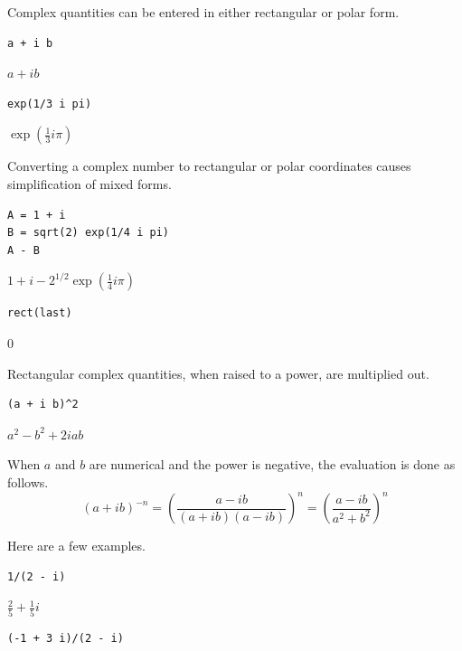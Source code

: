 \documentclass[12pt]{article}
\begin{document}
\bigskip

Complex quantities can be entered in either rectangular or polar form.

{\color{blue}
\begin{verbatim}
a + i b
\end{verbatim}
}

$\displaystyle a+ib$

{\color{blue}
\begin{verbatim}
exp(1/3 i pi)
\end{verbatim}
}

$\displaystyle \exp\left(\tfrac{1}{3}i\pi\right)$

\bigskip

Converting a complex number to rectangular or polar coordinates causes
simplification of mixed forms.

{\color{blue}
\begin{verbatim}
A = 1 + i
B = sqrt(2) exp(1/4 i pi)
A - B
\end{verbatim}
}

$\displaystyle 1+i-2^{1/2}\exp\left(\tfrac{1}{4}i\pi\right)$

{\color{blue}
\begin{verbatim}
rect(last)
\end{verbatim}
}

$\displaystyle 0$

\bigskip

Rectangular complex quantities, when raised to a power, are multiplied out.

{\color{blue}
\begin{verbatim}
(a + i b)^2
\end{verbatim}
}

$\displaystyle a^2-b^2+2iab$

\bigskip

When $a$ and $b$ are numerical and the power is negative, the evaluation is done as follows.
\begin{equation*}
(a+ib)^{-n}
=\left(\frac{a-ib}{(a+ib)(a-ib)}\right)^n=
\left(\frac{a-ib}{a^2+b^2}\right)^n
\end{equation*}

Here are a few examples.

{\color{blue}
\begin{verbatim}
1/(2 - i)
\end{verbatim}
}

$\displaystyle \tfrac{2}{5}+\tfrac{1}{5}i$

{\color{blue}
\begin{verbatim}
(-1 + 3 i)/(2 - i)
\end{verbatim}
}
\end{document}
